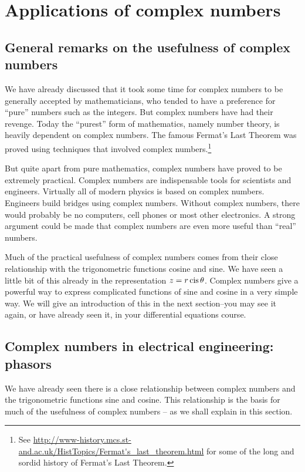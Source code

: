 \section{Applications of complex numbers\quad
{}}

\subsection{General remarks on the usefulness of complex numbers}

We have already discussed that it took some time for complex numbers to be generally accepted by mathematicians, who tended to have a preference for ``pure'' numbers such as the integers. But complex numbers have had their revenge. Today the ``purest'' form of mathematics, namely number theory, is heavily dependent on complex numbers. The famous Fermat's Last Theorem was proved using techniques that involved complex numbers.\footnote{See \url{http://www-history.mcs.st-and.ac.uk/HistTopics/Fermat's_last_theorem.html} for some of the long and sordid history of Fermat's Last Theorem.}

But quite apart from pure mathematics, complex numbers have proved to be extremely practical. Complex numbers are indispensable tools for
scientists and engineers. Virtually all of modern physics is based
on complex numbers. Engineers build bridges using complex numbers.
Without complex numbers, there would probably be no computers, cell
phones or most other electronics. A strong argument could be made that complex numbers are even more useful than ``real'' numbers.

Much of the practical usefulness of complex numbers comes from their close relationship
with the trigonometric functions cosine and sine. We have seen a little
bit of this already in the representation $z=r\operatorname{cis}\theta$.
Complex numbers give a powerful way to express complicated functions
of sine and cosine in a very simple way. We will give an introduction of this in the next section--you may see it again, or have already seen it, in your differential equations course.

\subsection{Complex numbers in electrical engineering: phasors}

We have already seen there is a close relationship between complex numbers and the trigonometric functions sine and cosine. This relationship is the basis for much of the usefulness of complex numbers -- as we shall explain in this section.

